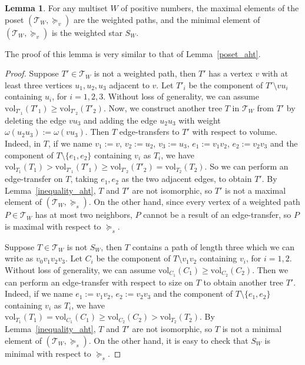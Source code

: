 \documentclass[11pt]{article}
\theoremstyle{definition}
\newtheorem{lemma}[theorem]{Lemma}
\newcommand{\vol}{\text{vol}}
\begin{document}
\begin{lemma}\label{poset_kemeny}
For any multiset $W$ of positive numbers, the maximal elements of the poset $(\mathcal{T}_W,\succeq_v)$ are the weighted paths, and the minimal element of $(\mathcal{T}_W,\succeq_v)$ is the weighted star $S_W$.
\end{lemma}
The proof of this lemma is very similar to that of Lemma~\ref{poset_aht}.
\begin{proof}
Suppose $T'\in \mathcal{T}_W$ is not a weighted path, then $T'$ has a vertex $v$ with at least three vertices $u_1,u_2,u_3$ adjacent to $v$. Let $T'_i$ be the component of $T'\setminus vu_i$ containing $u_i$, for $i=1,2,3$. Without loss of generality, we can assume $\vol_{T'_1}(T'_1)\geq \vol_{T'_2}(T'_2)$. Now, we construct another tree $T$ in $\mathcal{T}_W$ from $T'$ by deleting the edge $vu_3$ and adding the edge $u_2u_3$ with weight $\omega(u_2u_3):=\omega(vu_3)$. Then $T$ edge-transfers to $T'$ with respect to volume. Indeed, in $T$, if we name $v_1:=v$, $v_2:=u_2$, $v_3:=u_3$, $e_1:=v_1v_2$, $e_{2}:=v_2v_3$ and the component of $T\setminus\{e_1,e_2\}$ containing $v_i$ as $T_i$, we have $\vol_{T_1}(T_1)> \vol_{T'_1}(T'_1)\geq \vol_{T'_2}(T'_2)= \vol_{T_2}(T_2)$. So we can perform an edge-transfer on $T$, taking $e_1,e_2$ as the two adjacent edges, to obtain $T'$. By Lemma~\ref{inequality_aht}, $T$ and $T'$ are not isomorphic, so $T'$ is not a maximal element of $(\mathcal{T}_W,\succeq_s)$. On the other hand, since every vertex of a weighted path $P\in \mathcal{T}_W$ has at most two neighbors, $P$ cannot be a result of an edge-transfer, so $P$ is maximal with respect to $\succeq_s$.

Suppose $T\in \mathcal{T}_W$ is not $S_W$, then $T$ contains a path of length three which we can write as $v_0v_1v_2v_3$. Let $C_i$ be the component of $T\setminus v_1v_2$ containing $v_i$, for $i=1,2$. Without loss of generality, we can assume $\vol_{C_1}(C_1)\geq \vol_{C_2}(C_2)$. Then we can perform an edge-transfer with respect to size on $T$ to obtain another tree $T'$. Indeed, if we name $e_1:=v_1v_2$, $e_{2}:=v_2v_3$ and the component of $T\setminus\{e_1,e_2\}$ containing $v_i$ as $T_i$, we have $\vol_{T_1}(T_1)=\vol_{C_1}(C_1)\geq \vol_{C_2}(C_2)>\vol_{T_2}(T_2)$. By Lemma~\ref{inequality_aht}, $T$ and $T'$ are not isomorphic, so $T$ is not a minimal element of $(\mathcal{T}_W,\succeq_s)$. On the other hand, it is easy to check that $S_W$ is minimal with respect to $\succeq_s$.
\end{proof}
\end{document}
